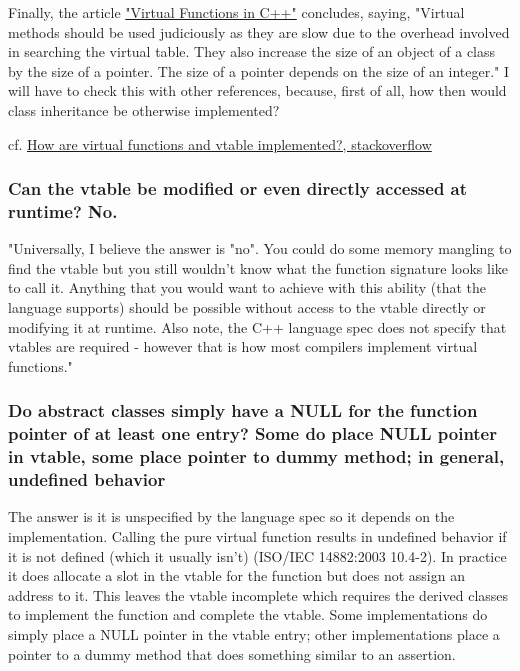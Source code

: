\documentclass[10pt]{amsart}
\begin{document}
Finally, the article \href{http://wayback.archive.org/web/20100209040010/http://www.codersource.net/published/view/325/virtual_functions_in.aspx}{"Virtual Functions in C++"} concludes, saying, "Virtual methods should be used judiciously as they are slow due to the overhead involved in searching the virtual table. They also increase the size of an object of a class by the size of a pointer. The size of a pointer depends on the size of an integer."  I will have to check this with other references, because, first of all, how then would class inheritance be otherwise implemented?  

cf. \href{https://stackoverflow.com/questions/99297/how-are-virtual-functions-and-vtable-implemented}{How are virtual functions and vtable implemented?, stackoverflow}  

\subsubsection{Can the vtable be modified or even directly accessed at runtime?  No.}  

"Universally, I believe the answer is "no". You could do some memory mangling to find the vtable but you still wouldn't know what the function signature looks like to call it. Anything that you would want to achieve with this ability (that the language supports) should be possible without access to the vtable directly or modifying it at runtime. Also note, the C++ language spec does not specify that vtables are required - however that is how most compilers implement virtual functions."  

\subsubsection{Do abstract classes simply have a NULL for the function pointer of at least one entry?  Some do place NULL pointer in vtable, some place pointer to dummy method; in general, undefined behavior}

The answer is it is unspecified by the language spec so it depends on the implementation. Calling the pure virtual function results in undefined behavior if it is not defined (which it usually isn't) (ISO/IEC 14882:2003 10.4-2). In practice it does allocate a slot in the vtable for the function but does not assign an address to it. This leaves the vtable incomplete which requires the derived classes to implement the function and complete the vtable. Some implementations do simply place a NULL pointer in the vtable entry; other implementations place a pointer to a dummy method that does something similar to an assertion.
\end{document}
